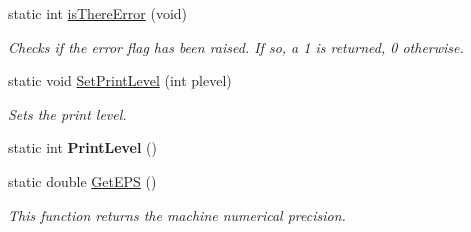 \begin{DoxyCompactItemize}
$$static int \hyperlink{classDMatrix_a3c854cc931571f2eba43f374e17ff18d}{isThereError} (void)
\begin{DoxyCompactList}\small\item\em Checks if the error flag has been raised. If so, a 1 is returned, 0 otherwise. \item\end{DoxyCompactList}\item 
static void \hyperlink{classDMatrix_a7521e5968a095edd6b80779f95b25309}{SetPrintLevel} (int plevel)
\begin{DoxyCompactList}\small\item\em Sets the print level. \item\end{DoxyCompactList}\item 
\hypertarget{classDMatrix_af784203b9838e92c481ab977498cfeb9}{
static int {\bfseries PrintLevel} ()}
\label{classDMatrix_af784203b9838e92c481ab977498cfeb9}

\item 
\hypertarget{classDMatrix_a8b81363f7e8e3eeef78851fa149b806f}{
static double \hyperlink{classDMatrix_a8b81363f7e8e3eeef78851fa149b806f}{GetEPS} ()}
\label{classDMatrix_a8b81363f7e8e3eeef78851fa149b806f}

\begin{DoxyCompactList}\small\item\em This function returns the machine numerical precision. \item\end{DoxyCompactList}\end{DoxyCompactItemize}
